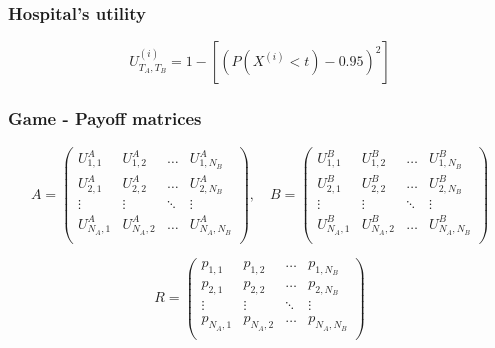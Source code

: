 \begin{frame}
    \frametitle{Hospital's utility}

    \begin{equation*}
        U_{T_A,T_B}^{(i)} = 1 - \left[ (P(X^{(i)} < t) - 0.95)^2 \right]
    \end{equation*}

\end{frame}

\begin{frame}
    \frametitle{Game - Payoff matrices}

    \scriptsize
    \begin{equation*}
        A = 
        \begin{pmatrix}
            U_{1,1}^A & U_{1,2}^A & \dots & U_{1,N_B}^A \\ 
            U_{2,1}^A & U_{2,2}^A & \dots & U_{2,N_B}^A \\
            \vdots & \vdots & \ddots & \vdots \\
            U_{N_A,1}^A & U_{N_A,2}^A & \dots & U_{N_A,N_B}^A \\
        \end{pmatrix}, \quad
        B = 
        \begin{pmatrix}
            U_{1,1}^B & U_{1,2}^B & \dots & U_{1,N_B}^B \\ 
            U_{2,1}^B & U_{2,2}^B & \dots & U_{2,N_B}^B \\
            \vdots & \vdots & \ddots & \vdots \\
            U_{N_A,1}^B & U_{N_A,2}^B & \dots & U_{N_A,N_B}^B \\
        \end{pmatrix}
    \end{equation*}

    \begin{equation*}
        R = 
        \begin{pmatrix}
            p_{1,1} & p_{1,2} & \dots & p_{1,N_B} \\ 
            p_{2,1} & p_{2,2} & \dots & p_{2,N_B} \\
            \vdots & \vdots & \ddots & \vdots \\
            p_{N_A,1} & p_{N_A,2} & \dots & p_{N_A,N_B} \\
        \end{pmatrix}
    \end{equation*}

\end{frame}
